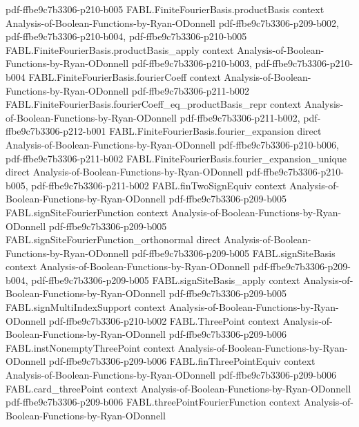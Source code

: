 \begin{theorem}
  {pdf-ffbe9c7b3306-p210-b005}
\proofstep
  {FABL.FiniteFourierBasis.productBasis}
  {context}
  {Analysis-of-Boolean-Functions-by-Ryan-ODonnell}
  {pdf-ffbe9c7b3306-p209-b002,
    pdf-ffbe9c7b3306-p210-b004,
    pdf-ffbe9c7b3306-p210-b005}
\proofstep
  {FABL.FiniteFourierBasis.productBasis_apply}
  {context}
  {Analysis-of-Boolean-Functions-by-Ryan-ODonnell}
  {pdf-ffbe9c7b3306-p210-b003,
    pdf-ffbe9c7b3306-p210-b004}
\proofstep
  {FABL.FiniteFourierBasis.fourierCoeff}
  {context}
  {Analysis-of-Boolean-Functions-by-Ryan-ODonnell}
  {pdf-ffbe9c7b3306-p211-b002}
\proofstep
  {FABL.FiniteFourierBasis.fourierCoeff_eq_productBasis_repr}
  {context}
  {Analysis-of-Boolean-Functions-by-Ryan-ODonnell}
  {pdf-ffbe9c7b3306-p211-b002,
    pdf-ffbe9c7b3306-p212-b001}
\proofstep
  {FABL.FiniteFourierBasis.fourier_expansion}
  {direct}
  {Analysis-of-Boolean-Functions-by-Ryan-ODonnell}
  {pdf-ffbe9c7b3306-p210-b006,
    pdf-ffbe9c7b3306-p211-b002}
\proofstep
  {FABL.FiniteFourierBasis.fourier_expansion_unique}
  {direct}
  {Analysis-of-Boolean-Functions-by-Ryan-ODonnell}
  {pdf-ffbe9c7b3306-p210-b005,
    pdf-ffbe9c7b3306-p211-b002}
\proofstep
  {FABL.finTwoSignEquiv}
  {context}
  {Analysis-of-Boolean-Functions-by-Ryan-ODonnell}
  {pdf-ffbe9c7b3306-p209-b005}
\proofstep
  {FABL.signSiteFourierFunction}
  {context}
  {Analysis-of-Boolean-Functions-by-Ryan-ODonnell}
  {pdf-ffbe9c7b3306-p209-b005}
\proofstep
  {FABL.signSiteFourierFunction_orthonormal}
  {direct}
  {Analysis-of-Boolean-Functions-by-Ryan-ODonnell}
  {pdf-ffbe9c7b3306-p209-b005}
\proofstep
  {FABL.signSiteBasis}
  {context}
  {Analysis-of-Boolean-Functions-by-Ryan-ODonnell}
  {pdf-ffbe9c7b3306-p209-b004,
    pdf-ffbe9c7b3306-p209-b005}
\proofstep
  {FABL.signSiteBasis_apply}
  {context}
  {Analysis-of-Boolean-Functions-by-Ryan-ODonnell}
  {pdf-ffbe9c7b3306-p209-b005}
\proofstep
  {FABL.signMultiIndexSupport}
  {context}
  {Analysis-of-Boolean-Functions-by-Ryan-ODonnell}
  {pdf-ffbe9c7b3306-p210-b002}
\proofstep
  {FABL.ThreePoint}
  {context}
  {Analysis-of-Boolean-Functions-by-Ryan-ODonnell}
  {pdf-ffbe9c7b3306-p209-b006}
\proofstep
  {FABL.instNonemptyThreePoint}
  {context}
  {Analysis-of-Boolean-Functions-by-Ryan-ODonnell}
  {pdf-ffbe9c7b3306-p209-b006}
\proofstep
  {FABL.finThreePointEquiv}
  {context}
  {Analysis-of-Boolean-Functions-by-Ryan-ODonnell}
  {pdf-ffbe9c7b3306-p209-b006}
\proofstep
  {FABL.card_threePoint}
  {context}
  {Analysis-of-Boolean-Functions-by-Ryan-ODonnell}
  {pdf-ffbe9c7b3306-p209-b006}
\proofstep
  {FABL.threePointFourierFunction}
  {context}
  {Analysis-of-Boolean-Functions-by-Ryan-ODonnell}

\end{theorem}
